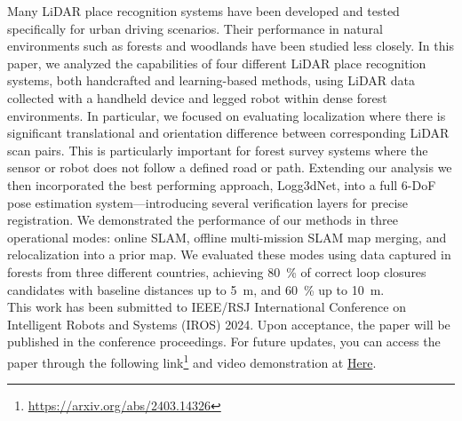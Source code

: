
Many LiDAR place recognition systems have been developed and tested specifically for urban driving scenarios. Their performance in natural environments such as forests and woodlands have been studied less closely.
In this paper, we analyzed the capabilities of four different LiDAR place recognition systems, both handcrafted and learning-based methods, using LiDAR data collected with a handheld device and legged robot within dense forest environments. 
In particular, we focused on evaluating localization where there is significant translational and orientation difference between corresponding LiDAR scan pairs. This is particularly important for forest survey systems where the sensor or robot does not follow a defined road or path. 
Extending our analysis we then incorporated the best performing approach, Logg3dNet, into a full 6-DoF pose estimation system---introducing several verification layers for precise registration. 
We demonstrated the performance of our methods in three operational modes: online SLAM, offline multi-mission SLAM map merging, and relocalization into a prior map. 
We evaluated these modes using data captured in forests from three different countries, achieving \SI{80}{\percent} of correct loop closures candidates with baseline distances up to \SI{5}{\meter}, and \SI{60}{\percent} up to \SI{10}{\meter}.  \\

This work has been submitted to IEEE/RSJ International Conference on Intelligent Robots and Systems (IROS) 2024. Upon acceptance, the paper will be published in the conference proceedings. For future updates, you can access the paper through the following link\footnote{\url{https://arxiv.org/abs/2403.14326}} and video demonstration at \url{Here}. 